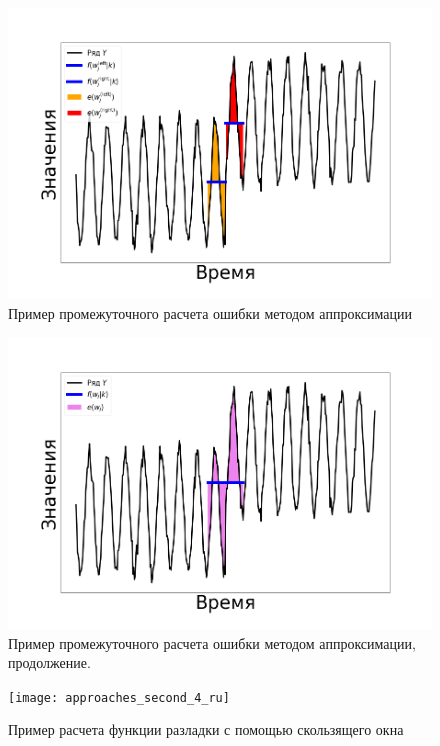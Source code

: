 \documentclass[%
12pt,
master,  %
natbib,      %
subf,        %
substylefile = spbu.rtx,
href,        %
colorlinks,  %
]{disser}
\begin{document}
\begin{figure}[!hhh]
	\begin{center}
		\includegraphics[width=12cm]{approaches_second_2_ru}
	\end{center}
	\vspace{-5mm}\caption{Пример промежуточного расчета ошибки методом аппроксимации}
	\label{fig:approximation_example_1}
\end{figure}

\begin{figure}[!hhh]
	\begin{center}
		\includegraphics[width=12cm]{approaches_second_3_ru}
	\end{center}
	\vspace{-5mm}\caption{Пример промежуточного расчета ошибки методом аппроксимации, продолжение.}
	\label{fig:approximation_example_2}
\end{figure}

\begin{figure}[!hhh]
	\begin{center}
		\texttt{[image: approaches\_second\_4\_ru]}
	\end{center}
	\vspace{-5mm}\caption{Пример расчета функции разладки с помощью скользящего окна}
	\label{fig:approximation_example_3}
\end{figure}
\end{document}
